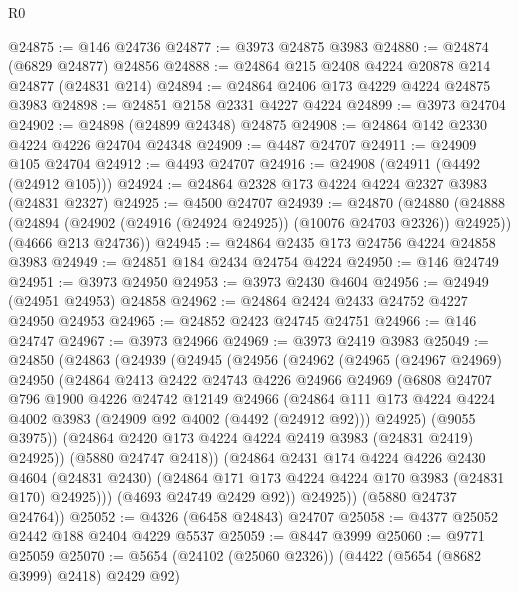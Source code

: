 \begin{lexlean}{R0}
\begin{coremodule}
@24875 := @146 @24736
@24877 := @3973 @24875 @3983
@24880 := @24874 (@6829 @24877) @24856
@24888 := @24864 @215 @2408 @4224 @20878 @214 @24877 (@24831 @214)
@24894 := @24864 @2406 @173 @4229 @4224 @24875 @3983
@24898 := @24851 @2158 @2331 @4227 @4224
@24899 := @3973 @24704
@24902 := @24898 (@24899 @24348) @24875
@24908 := @24864 @142 @2330 @4224 @4226 @24704 @24348
@24909 := @4487 @24707
@24911 := @24909 @105 @24704
@24912 := @4493 @24707
@24916 := @24908 (@24911 (@4492 (@24912 @105)))
@24924 := @24864 @2328 @173 @4224 @4224 @2327 @3983 (@24831 @2327)
@24925 := @4500 @24707
@24939 := @24870
    (@24880
      (@24888 (@24894 (@24902 (@24916 (@24924 @24925)) (@10076 @24703 @2326)) @24925))
      (@4666 @213 @24736))
@24945 := @24864 @2435 @173 @24756 @4224 @24858 @3983
@24949 := @24851 @184 @2434 @24754 @4224
@24950 := @146 @24749
@24951 := @3973 @24950
@24953 := @3973 @2430 @4604
@24956 := @24949 (@24951 @24953) @24858
@24962 := @24864 @2424 @2433 @24752 @4227 @24950 @24953
@24965 := @24852 @2423 @24745 @24751
@24966 := @146 @24747
@24967 := @3973 @24966
@24969 := @3973 @2419 @3983
@25049 := @24850
    (@24863
      (@24939
        (@24945
          (@24956
            (@24962
              (@24965
                (@24967 @24969)
                @24950
                (@24864
                  @2413
                  @2422
                  @24743
                  @4226
                  @24966
                  @24969
                  (@6808
                    @24707
                    @796
                    @1900
                    @4226
                    @24742
                    @12149
                    @24966
                    (@24864
                      @111
                      @173
                      @4224
                      @4224
                      @4002
                      @3983
                      (@24909 @92 @4002 (@4492 (@24912 @92)))
                      @24925)
                    (@9055 @3975))
                  (@24864 @2420 @173 @4224 @4224 @2419 @3983 (@24831 @2419) @24925))
                (@5880 @24747 @2418))
              (@24864
                @2431
                @174
                @4224
                @4226
                @2430
                @4604
                (@24831 @2430)
                (@24864 @171 @173 @4224 @4224 @170 @3983 (@24831 @170) @24925)))
            (@4693 @24749 @2429 @92))
          @24925))
      (@5880 @24737 @24764))
@25052 := @4326 (@6458 @24843) @24707
@25058 := @4377 @25052 @2442 @188 @2404 @4229 @5537
@25059 := @8447 @3999
@25060 := @9771 @25059
@25070 := @5654 (@24102 (@25060 @2326)) (@4422 (@5654 (@8682 @3999) @2418) @2429 @92)

\end{coremodule}
\end{lexlean}

